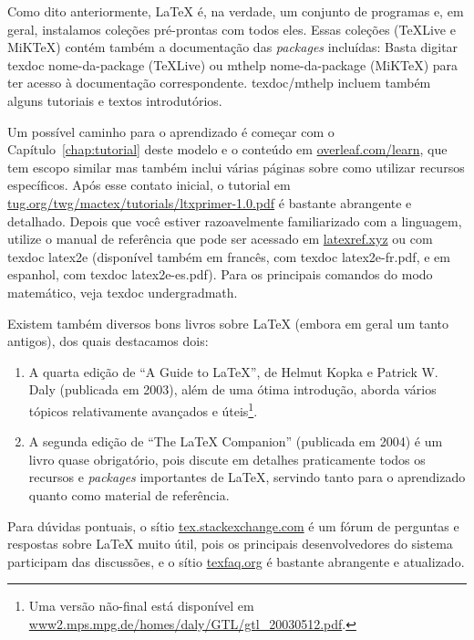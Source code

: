 Como dito anteriormente, \LaTeX{} é, na verdade, um conjunto de programas
e, em geral, instalamos coleções pré-prontas com todos eles. Essas coleções
(\TeX{}Live e MiK\TeX{}) contém também a documentação das \textit{packages}
incluídas: Basta digitar \textsf{texdoc nome-da-package} (\TeX{}Live) ou
\textsf{mthelp nome-da-package} (MiK\TeX{}) para ter acesso à documentação
correspondente. \textsf{texdoc/mthelp} incluem também alguns tutoriais e
textos introdutórios.

Um possível caminho para o aprendizado é começar com o
Capítulo~\ref{chap:tutorial} deste modelo e o conteúdo em
\url{overleaf.com/learn}, que tem escopo similar mas também inclui várias
páginas sobre como utilizar recursos específicos. Após esse contato inicial,
o tutorial em \url{tug.org/twg/mactex/tutorials/ltxprimer-1.0.pdf} é
bastante abrangente e detalhado. Depois que você estiver razoavelmente
familiarizado com a linguagem, utilize o manual de referência que pode ser
acessado em \url{latexref.xyz} ou com \textsf{texdoc latex2e} (disponível
também em francês, com \textsf{texdoc latex2e-fr.pdf}, e em espanhol, com
\textsf{texdoc latex2e-es.pdf}). Para os principais comandos do modo
matemático, veja \textsf{texdoc undergradmath}.

Existem também diversos bons livros sobre \LaTeX{} (embora em geral um
tanto antigos), dos quais destacamos dois:

\begin{enumerate}

  \item A quarta edição de ``A Guide to \LaTeX'', de Helmut Kopka
        e Patrick W. Daly (publicada em 2003), além de uma ótima
        introdução, aborda vários tópicos relativamente avançados
        e úteis\footnote{Uma versão não-final está disponível em
        \url{www2.mps.mpg.de/homes/daly/GTL/gtl_20030512.pdf}.}.
  \item A segunda edição de ``The \LaTeX{} Companion'' (publicada em
        2004) é um livro quase obrigatório, pois discute em detalhes
        praticamente todos os recursos e \textit{packages} importantes
        de \LaTeX{}, servindo tanto para o aprendizado quanto como
        material de referência.

\end{enumerate}

Para dúvidas pontuais, o sítio \url{tex.stackexchange.com} é um
fórum de perguntas e respostas sobre \LaTeX{} muito útil, pois os
principais desenvolvedores do sistema participam das discussões, e o
sítio \url{texfaq.org} é bastante abrangente e atualizado.

